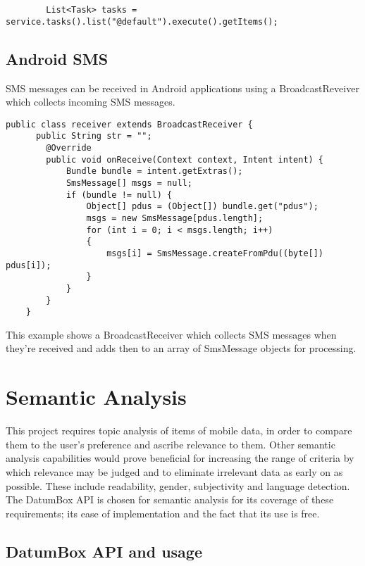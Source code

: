 \lstset{language=Java, caption=Google Tasks example, label=GoogleTasksExample}
\begin{lstlisting}
    	List<Task> tasks = service.tasks().list("@default").execute().getItems();
\end{lstlisting}

\subsection{Android SMS}
SMS messages can be received in Android applications using a BroadcastReveiver which collects incoming SMS messages.

\lstset{language=Java, caption=Android SMS example, label=AndroidSMSExample}
\begin{lstlisting}
public class receiver extends BroadcastReceiver {
      public String str = "";
        @Override
        public void onReceive(Context context, Intent intent) {
            Bundle bundle = intent.getExtras();
            SmsMessage[] msgs = null;
            if (bundle != null) {
                Object[] pdus = (Object[]) bundle.get("pdus");
                msgs = new SmsMessage[pdus.length];
                for (int i = 0; i < msgs.length; i++) 
                {
                    msgs[i] = SmsMessage.createFromPdu((byte[]) pdus[i]);
                }
            }
        }
    }
\end{lstlisting}

This example shows a BroadcastReceiver which collects SMS messages when they're received and adds then to an array of SmsMessage objects for processing. 

\section{Semantic Analysis}

This project requires topic analysis of items of mobile data, in order to compare them to the user's preference and ascribe relevance to them. Other semantic analysis capabilities would prove beneficial for increasing the range of criteria by which relevance may be judged and to eliminate irrelevant data as early on as possible. These include readability, gender, subjectivity and language detection. The DatumBox API is chosen for semantic analysis for its coverage of these requirements; its ease of implementation and the fact that its use is free. 

\subsection{DatumBox API and usage}

